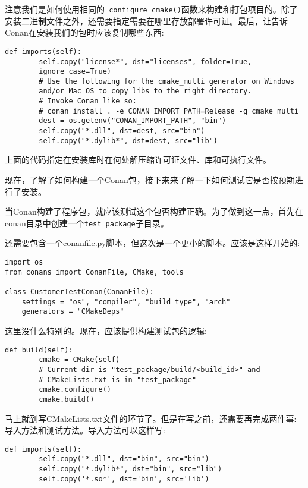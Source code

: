 注意我们是如何使用相同的\texttt{\_configure\_cmake()}函数来构建和打包项目的。除了安装二进制文件之外，还需要指定需要在哪里存放部署许可证。最后，让告诉Conan在安装我们的包时应该复制哪些东西:

\begin{lstlisting}[style=stylePython]
	def imports(self):
		self.copy("license*", dst="licenses", folder=True,
		ignore_case=True)
		# Use the following for the cmake_multi generator on Windows
		and/or Mac OS to copy libs to the right directory.
		# Invoke Conan like so:
		# conan install . -e CONAN_IMPORT_PATH=Release -g cmake_multi
		dest = os.getenv("CONAN_IMPORT_PATH", "bin")
		self.copy("*.dll", dst=dest, src="bin")
		self.copy("*.dylib*", dst=dest, src="lib")
\end{lstlisting}

上面的代码指定在安装库时在何处解压缩许可证文件、库和可执行文件。

现在，了解了如何构建一个Conan包，接下来来了解一下如何测试它是否按预期进行了安装。


当Conan构建了程序包，就应该测试这个包否构建正确。为了做到这一点，首先在conan目录中创建一个\texttt{test\_package}子目录。

还需要包含一个conanfile.py脚本，但这次是一个更小的脚本。应该是这样开始的:

\begin{lstlisting}[style=stylePython]
import os
from conans import ConanFile, CMake, tools

class CustomerTestConan(ConanFile):
	settings = "os", "compiler", "build_type", "arch"
	generators = "CMakeDeps"
\end{lstlisting}

这里没什么特别的。现在，应该提供构建测试包的逻辑:

\begin{lstlisting}[style=stylePython]
	def build(self):
		cmake = CMake(self)
		# Current dir is "test_package/build/<build_id>" and
		# CMakeLists.txt is in "test_package"
		cmake.configure()
		cmake.build()
\end{lstlisting}

马上就到写CMakeLists.txt文件的环节了。但是在写之前，还需要再完成两件事:导入方法和测试方法。导入方法可以这样写:

\begin{lstlisting}[style=stylePython]
	def imports(self):
		self.copy("*.dll", dst="bin", src="bin")
		self.copy("*.dylib*", dst="bin", src="lib")
		self.copy('*.so*', dst='bin', src='lib')
\end{lstlisting}

